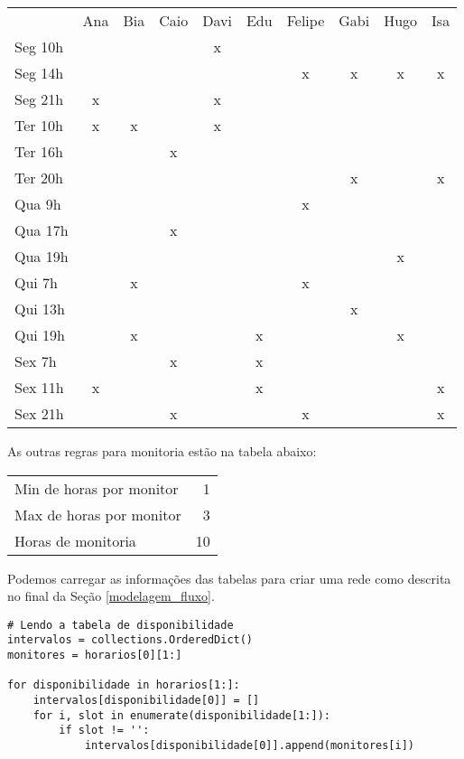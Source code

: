 \documentclass[11pt]{article}
\begin{document}
\begin{center}
\begin{tabular}{lccccccccc}
 & Ana & Bia & Caio & Davi & Edu & Felipe & Gabi & Hugo & Isa\\
Seg 10h &  &  &  & x &  &  &  &  & \\
Seg 14h &  &  &  &  &  & x & x & x & x\\
Seg 21h & x &  &  & x &  &  &  &  & \\
Ter 10h & x & x &  & x &  &  &  &  & \\
Ter 16h &  &  & x &  &  &  &  &  & \\
Ter 20h &  &  &  &  &  &  & x &  & x\\
Qua 9h &  &  &  &  &  & x &  &  & \\
Qua 17h &  &  & x &  &  &  &  &  & \\
Qua 19h &  &  &  &  &  &  &  & x & \\
Qui 7h &  & x &  &  &  & x &  &  & \\
Qui 13h &  &  &  &  &  &  & x &  & \\
Qui 19h &  & x &  &  & x &  &  & x & \\
Sex 7h &  &  & x &  & x &  &  &  & \\
Sex 11h & x &  &  &  & x &  &  &  & x\\
Sex 21h &  &  & x &  &  & x &  &  & x\\
\end{tabular}
\end{center}
As outras regras para monitoria estão na tabela abaixo:

\begin{center}
\begin{tabular}{lr}
Min de horas por monitor & 1\\
Max de horas por monitor & 3\\
Horas de monitoria & 10\\
\end{tabular}
\end{center}

Podemos carregar as informações das tabelas para criar uma rede como
descrita no final da Seção \ref{modelagem_fluxo}.
\begin{verbatim}
# Lendo a tabela de disponibilidade
intervalos = collections.OrderedDict()
monitores = horarios[0][1:]

for disponibilidade in horarios[1:]:
    intervalos[disponibilidade[0]] = []
    for i, slot in enumerate(disponibilidade[1:]):
        if slot != '':
            intervalos[disponibilidade[0]].append(monitores[i])
\end{verbatim}
\end{document}
